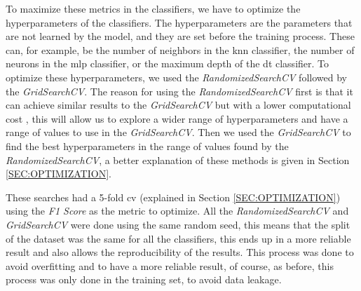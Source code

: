 To maximize these metrics in the classifiers, we have to optimize the hyperparameters of the classifiers. The hyperparameters are the parameters that are not learned by the model, and they are set before the training process. These can, for example, be the number of neighbors in the \ac{knn} classifier, the number of neurons in the \ac{mlp} classifier, or the maximum depth of the \ac{dt} classifier. To optimize these hyperparameters, we used the \textit{RandomizedSearchCV} followed by the \textit{GridSearchCV}. The reason for using the \textit{RandomizedSearchCV} first is that it can achieve similar results to the \textit{GridSearchCV} but with a lower computational cost \cite{bergstra_random_nodate}, this will allow us to explore a wider range of hyperparameters and have a range of values to use in the \textit{GridSearchCV}. Then we used the \textit{GridSearchCV} to find the best hyperparameters in the range of values found by the \textit{RandomizedSearchCV}, a better explanation of these methods is given in Section \ref{SEC:OPTIMIZATION}.

These searches 
had 
a 5-fold \ac{cv} (explained in Section \ref{SEC:OPTIMIZATION}) using the \textit{F1 Score} as the metric to optimize. All the \textit{RandomizedSearchCV} and \textit{GridSearchCV} were done using the same random seed, this means that the split of the dataset was the same for all the classifiers, this ends up in a more reliable result and also allows the reproducibility of the results. This process was done to avoid overfitting and to have a more reliable result, of course, as before, this process was only done in the training set, to avoid data leakage.